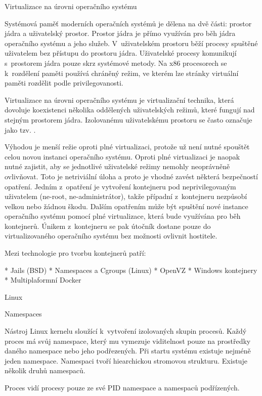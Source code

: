 \sec Virtualizace na úrovni operačního systému

Systémová paměť moderních operačních systémů je dělena na dvě části: prostor jádra a uživatelský prostor.
Prostor jádra je přímo využíván pro běh jádra operačního systému a jeho služeb.
V~uživatelském prostoru běží procesy spuštěné uživatelem bez přístupu do prostoru jádra.
Uživatelské procesy komunikují s~prostorem jádra pouze skrz systémové metody.
Na x86 procesorech se k~rozdělení paměti používá chráněný režim, ve kterém lze stránky virtuální paměti rozdělit podle privilegovanosti.

Virtualizace na úrovni operačního systému je virtualizační technika, která dovoluje koexistenci několika oddělených uživatelských režimů, které fungují nad stejným prostorem jádra.
Izolovanému uživatelskému prostoru se často označuje jako tzv. .

Výhodou je menší režie oproti plné virtualizaci, protože už není nutné spouštět celou novou instanci operačního systému.
Oproti plné virtualizaci je naopak nutné zajistit, aby se jednotlivé uživatelské režimy nemohly neoprávněně ovlivňovat.
Toto je netriviální úloha a proto je vhodné zavést některá bezpečností opatření.
Jedním z~opatření je vytvoření kontejneru pod neprivilegovaným uživatelem (ne-root, ne-administrátor), takže případní  z~kontejneru nezpůsobí velkou nebo žádnou škodu.
Dalším opatřením může být spuštění nové instance operačního systému pomocí plné virtualizace, která bude využívána pro běh kontejnerů.
Únikem z~kontejneru se pak útočník dostane pouze do virtualizovaného operačního systému bez možnosti ovlivnit hostitele.

{
\smallskip\noindent
Mezi technologie pro tvorbu kontejnerů patří:

\begitems
* Jails (BSD)
* Namespaces a Cgroups (Linux)
* OpenVZ
* Windows kontejnery
* Multiplaformní Docker
\enditems
}

\secc Linux

\seccc Namespaces

Nástroj Linux kernelu sloužící k~vytvoření izolovaných skupin procesů.
Každý proces má svůj namespace, který mu vymezuje viditelnost pouze na prostředky daného namespace nebo jeho podřezených.
Při startu systému existuje nejméně jeden namespace.
Namespaci tvoří hiearchickou stromovou strukturu.
Existuje několik druhů namespaců.

\smallskip{}\break\noindent
Proces vidí procesy pouze ze své PID namespace a namespaců podřízených.

